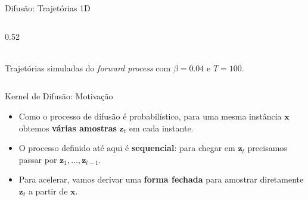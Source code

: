 \documentclass[aspectratio=169,xcolor=dvipsnames]{beamer}
\begin{document}
\begin{frame}{Difusão: Trajetórias 1D}
\begin{columns}[T]
\begin{column}{0.52\textwidth}
\\[0.2em]
        {\tiny Trajetórias simuladas do \textit{forward process} com
        $\beta = 0.04$ e $T = 100$.}
      \end{column}
    \end{columns}
  \end{frame}


  \begin{frame}{Kernel de Difusão: Motivação}
    \begin{itemize}
      \item Como o processo de difusão é probabilístico, para uma mesma
      instância $\mathbf{x}$ obtemos \textbf{várias amostras} $\mathbf{z}_t$ em cada
      instante.
      \item O processo definido até aqui é \textbf{sequencial}: para
      chegar em $\mathbf{z}_t$ precisamos passar por $\mathbf{z}_1, \ldots, \mathbf{z}_{t-1}$.
      \item Para acelerar, vamos derivar uma \textbf{forma fechada}
      para amostrar diretamente $\mathbf{z}_t$ a partir de $\mathbf{x}$.
    \end{itemize}
  \end{frame}
\end{document}
